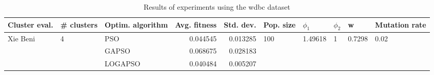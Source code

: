 \begin{table}
\centering
\caption{Results of experiments using the wdbc dataset}
\begin{tabular}{lllrrlllll}
\toprule
            Cluster eval. &        \# clusters & Optim. algorithm &  Avg. fitness &  Std. dev. &            Pop. size &               $\phi_{1}$ &         $\phi_{2}$ &                       w &         Mutation rate \\
\midrule
\multirow{3}{*}{Xie Beni} & \multirow{3}{*}{4} &              PSO &      0.044545 &   0.013285 & \multirow{3}{*}{100} & \multirow{3}{*}{1.49618} & \multirow{3}{*}{1} & \multirow{3}{*}{0.7298} & \multirow{3}{*}{0.02} \\
                          &                    &            GAPSO &      0.068675 &   0.028183 &                      &                          &                    &                         &                       \\
                          &                    &          LOGAPSO &      0.040484 &   0.005207 &                      &                          &                    &                         &                       \\
\bottomrule
\end{tabular}
\end{table}
